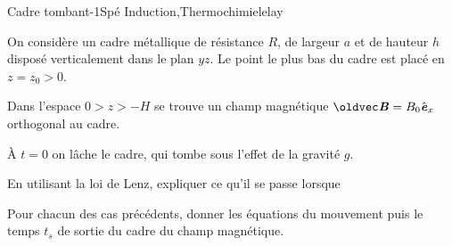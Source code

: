 \begin{exercise}{Cadre tombant}{-1}{Spé}
{Induction,Thermochimie}{lelay}

On considère un cadre métallique de résistance $R$, de largeur $a$ et de hauteur $h$ disposé verticalement dans le plan $yz$. Le point le plus bas du cadre est placé en $z = z_0 > 0$.

Dans l'espace $0 > z > -H$ se trouve un champ magnétique $\vec{B} = B_0\ve_x$ orthogonal au cadre.

À $t=0$ on lâche le cadre, qui tombe sous l'effet de la gravité $g$.

\begin{questions}
    \question En utilisant la loi de Lenz, expliquer ce qu'il se passe lorsque
    \question Pour chacun des cas précédents, donner les équations du mouvement puis le temps $t_s$ de sortie du cadre du champ magnétique.
\end{questions}

\end{exercise}

